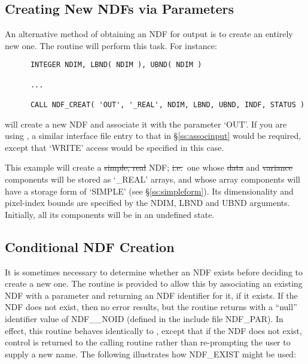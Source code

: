 \subsection{\label{ss:creatingndfs}Creating New NDFs via Parameters}

An alternative method of obtaining an NDF for output is to create an
entirely new one. 
The  routine will perform this task.
For instance:

\small
\begin{verbatim}
      INTEGER NDIM, LBND( NDIM ), UBND( NDIM )

      ...

      CALL NDF_CREAT( 'OUT', '_REAL', NDIM, LBND, UBND, INDF, STATUS )
\end{verbatim}
\normalsize

will create a new NDF and associate it with the parameter `OUT'.  If
you are using , a similar interface file entry to that in
\S\ref{ss:associnput} would be required, except that `WRITE' access
would be specified in this case.

This example will create a \st{simple, real\/} NDF; \st{i.e.}\ one whose
\st{data\/} and \st{variance\/} components will be stored as `\_REAL'
arrays, and whose array components will have a storage form of `SIMPLE' (see
\S\ref{ss:simpleform}). 
Its dimensionality and pixel-index bounds are specified by the NDIM, LBND
and UBND arguments. 
Initially, all its components will be in an undefined state.

\subsection{\label{ss:exist}Conditional NDF Creation}

It is sometimes necessary to determine whether an NDF exists before deciding
to create a new one. 
The routine  is provided to allow this by associating an existing
NDF with a parameter and returning an NDF identifier for it, if it
exists. 
If the NDF does not exist, then no error results, but the routine returns
with a ``null'' identifier value of NDF\_\_NOID (defined in the include file
NDF\_PAR). 
In effect, this routine behaves identically to , except that if
the NDF does not exist, control is returned to the calling routine rather
than re-prompting the user to supply a new name. 
The following illustrates how NDF\_EXIST might be used:

